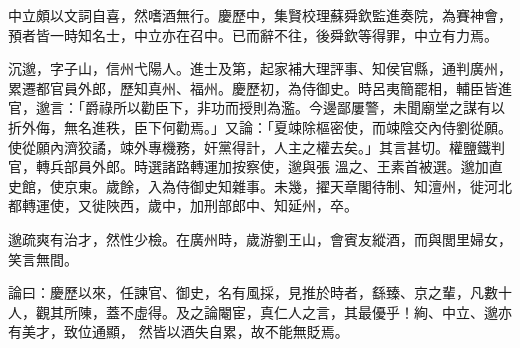 \begin{pinyinscope}
 中立頗以文詞自喜，然嗜酒無行。慶歷中，集賢校理蘇舜欽監進奏院，為賽神會，預者皆一時知名士，中立亦在召中。已而辭不往，後舜欽等得罪，中立有力焉。



 沉邈，字子山，信州弋陽人。進士及第，起家補大理評事、知侯官縣，通判廣州，累遷都官員外郎，歷知真州、福州。慶歷初，為侍御史。時呂夷簡罷相，輔臣皆進官，邈言：「爵祿所以勸臣下，非功而授則為濫。今邊鄙屢警，未聞廟堂之謀有以折外侮，無名進秩，臣下何勸焉。」又論：「夏竦除樞密使，而竦陰交內侍劉從願。使從願內濟狡譎，竦外專機務，奸黨得計，人主之權去矣。」其言甚切。權鹽鐵判官，轉兵部員外郎。時選諸路轉運加按察使，邈與張
 溫之、王素首被選。邈加直史館，使京東。歲餘，入為侍御史知雜事。未幾，擢天章閣待制、知澶州，徙河北都轉運使，又徙陜西，歲中，加刑部郎中、知延州，卒。



 邈疏爽有治才，然性少檢。在廣州時，歲游劉王山，會賓友縱酒，而與閭里婦女，笑言無間。



 論曰：慶歷以來，任諫官、御史，名有風採，見推於時者，繇臻、京之輩，凡數十人，觀其所陳，蓋不虛得。及之論閹宦，真仁人之言，其最優乎！絢、中立、邈亦有美才，致位通顯，
 然皆以酒失自累，故不能無貶焉。



\end{pinyinscope}